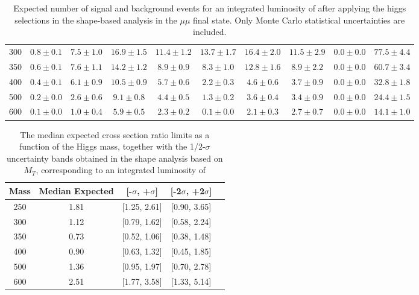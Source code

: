 \begin{table}
{\begin{center}
\begin{tabular}{l | c c |  c c c c c c c }
300 & $0.8\pm0.1$ & $7.5\pm1.0$ & $16.9\pm1.5$ & $11.4\pm1.2$ & $13.7\pm1.7$ & $16.4\pm2.0$ & $11.5\pm2.9$ & $0.0\pm0.0$ & $77.5\pm4.4$ \\ %
350 & $0.6\pm0.1$ & $7.6\pm1.1$ & $14.2\pm1.2$ & $8.9\pm0.9$ & $8.3\pm1.0$ & $12.8\pm1.6$ & $8.9\pm2.2$ & $0.0\pm0.0$ & $60.7\pm3.4$ \\ %
400 & $0.4\pm0.1$ & $6.1\pm0.9$ & $10.5\pm0.9$ & $5.7\pm0.6$ & $2.2\pm0.3$ & $4.6\pm0.6$ & $3.7\pm0.9$ & $0.0\pm0.0$ & $32.8\pm1.8$ \\%
500 & $0.2\pm0.0$ & $2.6\pm0.6$ & $9.1\pm0.8$ & $4.4\pm0.5$ & $1.3\pm0.2$ & $3.6\pm0.4$ & $3.4\pm0.9$ & $0.0\pm0.0$ & $24.4\pm1.5$ \\ %
600 & $0.1\pm0.0$ & $1.0\pm0.4$ & $5.9\pm0.5$ & $2.3\pm0.2$ & $0.1\pm0.0$ & $2.1\pm0.3$ & $2.7\pm0.7$ & $0.0\pm0.0$ & $14.1\pm1.0$ \\%
\hline
\end{tabular}
\end{center}
}
\caption{Expected number of signal and background events for an 
  integrated luminosity of \intlumi after applying the higgs selections in the shape-based analysis in the $\mu\mu$ final state. 
  Only Monte Carlo statistical uncertainties are included. }
\label{tab:yield_shapebased_mm}
\end{table}

\begin{table}
\begin{center}
\begin{tabular}{ccccc}
\hline
 Mass & Median Expected & [-$\sigma$, +$\sigma$] & [-2$\sigma$, +2$\sigma$]\\\hline
 250 & 1.81 & [1.25, 2.61] & [0.90, 3.65] \\
300 & 1.12 & [0.79, 1.62] & [0.58, 2.24] \\
350 & 0.73 & [0.52, 1.06] & [0.38, 1.48] \\
400 & 0.90 & [0.63, 1.32] & [0.45, 1.85] \\
500 & 1.36 & [0.95, 1.97] & [0.70, 2.78] \\
600 & 2.51 & [1.77, 3.58] & [1.33, 5.14] \\
\hline
\end{tabular}
\end{center}
\label{tab:limits_mtshape_2fb}
\caption{\fixme The median expected cross section ratio limits as a function 
of the Higgs mass, together with the 1/2-$\sigma$ uncertainty bands obtained in the shape analysis based on $M_T$, corresponding to 
an integrated luminosity of \intlumi}
\end{table}